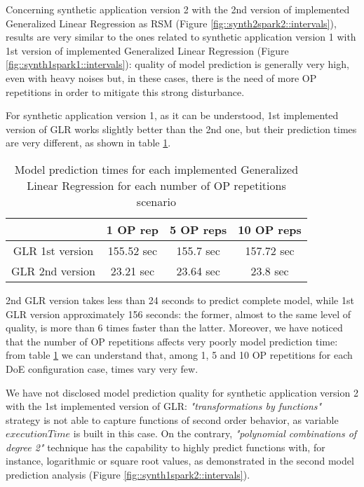 Concerning synthetic application version 2 with the 2nd version of implemented Generalized Linear Regression as RSM (Figure \ref{fig::synth2spark2::intervals}), results are very similar to the ones related to synthetic application version 1 with 1st version of implemented Generalized Linear Regression (Figure \ref{fig::synth1spark1::intervals}): quality of model prediction is generally very high, even with heavy noises but, in these cases, there is the need of more OP repetitions in order to mitigate this strong disturbance.

For synthetic application version 1, as it can be understood, 1st implemented version of GLR works slightly better than the 2nd one, but their prediction times are very different, as shown in table \ref{tab::GLRtimes}.

\begin{table}[htb]

    \centering
    
    \begin{tabular}{cccc}
    
        \toprule
         & 1 OP rep & 5 OP reps & 10 OP reps \\
        \midrule
        GLR 1st version & 155.52 sec & 155.7 sec & 157.72 sec \\
        GLR 2nd version & 23.21 sec & 23.64 sec & 23.8 sec \\
        \bottomrule 
    
    \end{tabular}

    \caption{Model prediction times for each implemented Generalized Linear Regression for each number of OP repetitions scenario}
    \label{tab::GLRtimes}
    
\end{table}

2nd GLR version takes less than 24 seconds to predict complete model, while 1st GLR version approximately 156 seconds: the former, almost to the same level of quality, is more than 6 times faster than the latter. Moreover, we have noticed that the number of OP repetitions affects very poorly model prediction time: from table \ref{tab::GLRtimes} we can understand that, among 1, 5 and 10 OP repetitions for each DoE configuration case, times vary very few.

We have not disclosed model prediction quality for synthetic application version 2 with the 1st implemented version of GLR: \textit{"transformations by functions"} strategy is not able to capture functions of second order behavior, as variable $executionTime$ is built in this case. On the contrary, \textit{"polynomial combinations of degree 2"} technique has the capability to highly predict functions with, for instance, logarithmic or square root values, as demonstrated in the second model prediction analysis (Figure \ref{fig::synth1spark2::intervals}).

